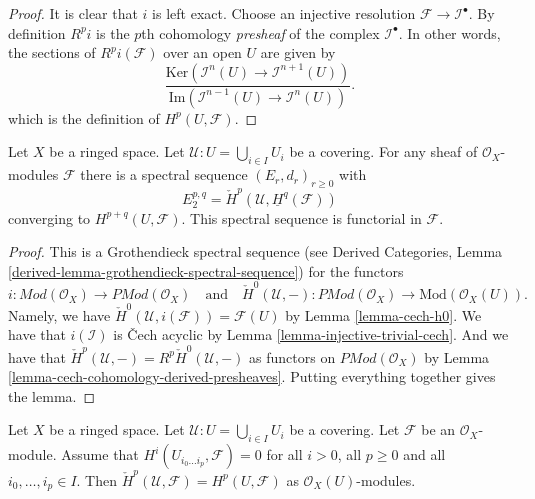 \begin{proof}
It is clear that $i$ is left exact.
Choose an injective resolution $\mathcal{F} \to \mathcal{I}^\bullet$.
By definition $R^pi$ is the $p$th cohomology {\it presheaf}
of the complex $\mathcal{I}^\bullet$. In other words, the
sections of $R^pi(\mathcal{F})$ over an open $U$ are given by
$$
\frac{\text{Ker}(\mathcal{I}^n(U) \to \mathcal{I}^{n + 1}(U))}
{\text{Im}(\mathcal{I}^{n - 1}(U) \to \mathcal{I}^n(U))}.
$$
which is the definition of $H^p(U, \mathcal{F})$.
\end{proof}

\begin{lemma}
\label{lemma-cech-spectral-sequence}
Let $X$ be a ringed space.
Let $\mathcal{U} : U = \bigcup_{i \in I} U_i$ be a covering.
For any sheaf of $\mathcal{O}_X$-modules $\mathcal{F}$ there
is a spectral sequence $(E_r, d_r)_{r \geq 0}$ with
$$
E_2^{p, q} = \check{H}^p(\mathcal{U}, \underline{H}^q(\mathcal{F}))
$$
converging to $H^{p + q}(U, \mathcal{F})$.
This spectral sequence is functorial in $\mathcal{F}$.
\end{lemma}

\begin{proof}
This is a Grothendieck spectral sequence
(see
Derived Categories, Lemma \ref{derived-lemma-grothendieck-spectral-sequence})
for the functors
$$
i :  \textit{Mod}(\mathcal{O}_X) \to \textit{PMod}(\mathcal{O}_X)
\quad\text{and}\quad
\check{H}^0(\mathcal{U}, - ) : \textit{PMod}(\mathcal{O}_X)
\to \text{Mod}(\mathcal{O}_X(U)).
$$
Namely, we have $\check{H}^0(\mathcal{U}, i(\mathcal{F})) = \mathcal{F}(U)$
by Lemma \ref{lemma-cech-h0}. We have that $i(\mathcal{I})$ is
{\v C}ech acyclic by Lemma \ref{lemma-injective-trivial-cech}. And we
have that $\check{H}^p(\mathcal{U}, -) = R^p\check{H}^0(\mathcal{U}, -)$
as functors on $\textit{PMod}(\mathcal{O}_X)$
by Lemma \ref{lemma-cech-cohomology-derived-presheaves}.
Putting everything together gives the lemma.
\end{proof}

\begin{lemma}
\label{lemma-cech-spectral-sequence-application}
Let $X$ be a ringed space.
Let $\mathcal{U} : U = \bigcup_{i \in I} U_i$ be a covering.
Let $\mathcal{F}$ be an $\mathcal{O}_X$-module.
Assume that $H^i(U_{i_0 \ldots i_p}, \mathcal{F}) = 0$
for all $i > 0$, all $p \geq 0$ and all $i_0, \ldots, i_p \in I$.
Then $\check{H}^p(\mathcal{U}, \mathcal{F}) = H^p(U, \mathcal{F})$
as $\mathcal{O}_X(U)$-modules.
\end{lemma}

